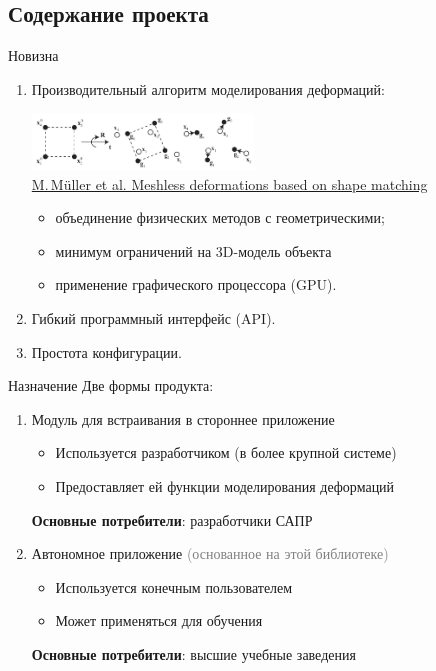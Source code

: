 \documentclass[usenames,dvipsnames,pdftex,unicode,hidelinks]{beamer}
\let\softalert\textbf  %
\newcommand{\GPU}{\alert{GPU}} %
\begin{document}
  \subsection{Содержание проекта}
  \begin{frame}{Новизна}
    \begin{enumerate}
      \setlength{\itemsep}{4mm}
      \item Производительный алгоритм моделирования деформаций:

        \includegraphics[height=15mm]{meshless}\\[-2mm]
        {
          \tiny \textcopyright{} \href{http://dx.doi.org/10.1145/1186822.1073216}{M.\,M\"{u}ller et al. Meshless deformations based on shape matching}
        }
        \begin{itemize}
          \item объединение физических методов с \alert{геометрическими};
          \item \alert{минимум ограничений} на 3D-модель объекта
          \item применение графического процессора (\GPU).
        \end{itemize}
      \item \alert{Гибкий} программный интерфейс (API).
      \item Простота \alert{конфигурации}.
    \end{enumerate}
  \end{frame}

  \begin{frame}{Назначение}
    Две формы продукта:

    \begin{enumerate}
      \setlength{\itemsep}{5mm}
      \item Модуль для встраивания в стороннее приложение
        \begin{itemize}
          \item Используется разработчиком (в более крупной системе)
          \item Предоставляет ей функции моделирования деформаций
        \end{itemize}
        \softalert{Основные потребители}: разработчики САПР
      \item Автономное приложение \textcolor{Gray}{(основанное на этой библиотеке)}
        \begin{itemize}
          \item Используется конечным пользователем
          \item Может применяться для обучения
        \end{itemize}
        \softalert{Основные потребители}: высшие учебные заведения
    \end{enumerate}
  \end{frame}
\end{document}
